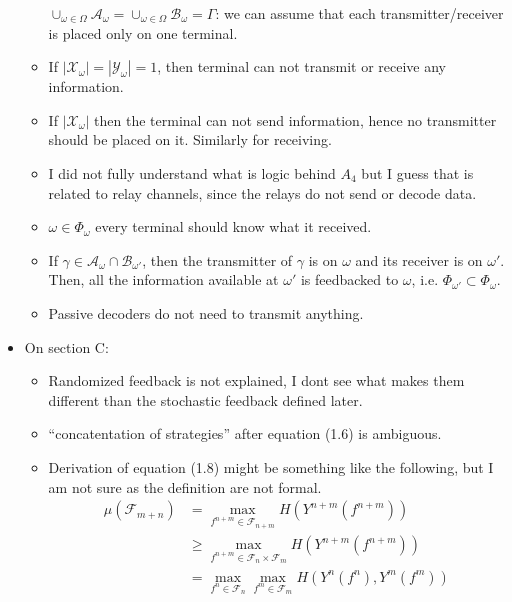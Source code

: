 \documentclass{article}
\newcommand{\abs}[1]{\left| #1 \right|}
\begin{document}
\begin{itemize}
\begin{itemize}
		            \(\cup_{\omega \in \Omega} \mathcal{A}_{\omega} = \cup_{\omega \in \Omega } \mathcal{B}_{\omega} = \Gamma\): we can assume that each transmitter/receiver is placed only on one terminal.
		      \item If \(\abs{\mathcal{X}_{\omega}} = \abs{\mathcal{Y}_{\omega}} = 1\), then terminal can not transmit or receive any information.
		      \item If \(\abs{\mathcal{X}_{\omega}}\) then the terminal can not send information, hence no transmitter should be placed on it. Similarly for receiving.
		      \item I did not fully understand what is logic behind \(A_4\) but I guess that is related to relay channels, since the relays do not send or decode data.
		      \item \(\omega \in \Phi_{\omega}\) every terminal should know what it received.
		      \item If \(\gamma \in \mathcal{A}_{\omega} \cap \mathcal{B}_{\omega'}\), then the transmitter of \(\gamma\) is on \(\omega\) and its receiver is on \(\omega'\). Then, all the information available at \(\omega'\) is feedbacked to \(\omega\), i.e. \(\Phi_{\omega'} \subset \Phi_{\omega}\).
		      \item Passive decoders do not need to transmit anything.
	      \end{itemize}
	\item On section C:
	      \begin{itemize}
		      \item Randomized feedback is not explained, I dont see what makes them different than the stochastic feedback defined later.
		      \item ``concatentation of strategies'' after equation (1.6) is ambiguous.
		      \item Derivation of equation (1.8) might be something like the following, but I am not sure as the definition are not formal.
		            \begin{align*}
			            \mu(\mathcal{F}_{m + n}) & = \max_{f^{n + m} \in \mathcal{F}_{n + m}} H(Y^{n + m}(f^{n+ m}))                              \\
			                                     & \geq  \max_{f^{n + m} \in \mathcal{F}_n \times \mathcal{F}_m } H(Y^{n + m}(f^{n+ m}))          \\
			                                     & = \max_{f^{n} \in \mathcal{F}_n} \max_{f^m \in \mathcal{F}_m } H(Y^{n }(f^{n}) , Y^m(f^m))     \\

\end{align*}
\end{itemize}
\end{itemize}
\end{document}
